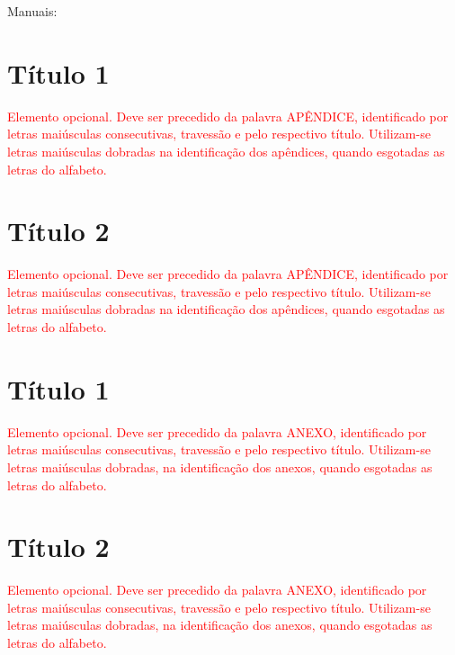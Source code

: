 \documentclass[
	12pt,				%
	openright,			%
	oneside,			%
	a4paper,			%
	english,			%
	french,				%
	spanish,			%
	brazil				%
	]{abntex2UFMT}
\begin{document}
Manuais: \cite{NBR10520:2002,abntex2classe,abntex2cite,abntex2cite-alf}




\begin{apendicesenv}

\chapter{Título 1}

\textcolor{red}{Elemento opcional. Deve ser precedido da palavra APÊNDICE, identificado por letras maiúsculas consecutivas, travessão e pelo respectivo título. Utilizam-se letras maiúsculas dobradas na identificação dos apêndices, quando esgotadas as letras do alfabeto.}

\chapter{Título 2}

\textcolor{red}{Elemento opcional. Deve ser precedido da palavra APÊNDICE, identificado por letras maiúsculas consecutivas, travessão e pelo respectivo título. Utilizam-se letras maiúsculas dobradas na identificação dos apêndices, quando esgotadas as letras do alfabeto.}

\end{apendicesenv}


\begin{anexosenv}

\chapter{Título 1}

\textcolor{red}{Elemento opcional. Deve ser precedido da palavra ANEXO, identificado por letras maiúsculas consecutivas, travessão e pelo respectivo título. Utilizam-se letras maiúsculas dobradas, na identificação dos anexos, quando esgotadas as letras do alfabeto.}

\chapter{Título 2}

\textcolor{red}{Elemento opcional. Deve ser precedido da palavra ANEXO, identificado por letras maiúsculas consecutivas, travessão e pelo respectivo título. Utilizam-se letras maiúsculas dobradas, na identificação dos anexos, quando esgotadas as letras do alfabeto.}

\end{anexosenv}
\end{document}
